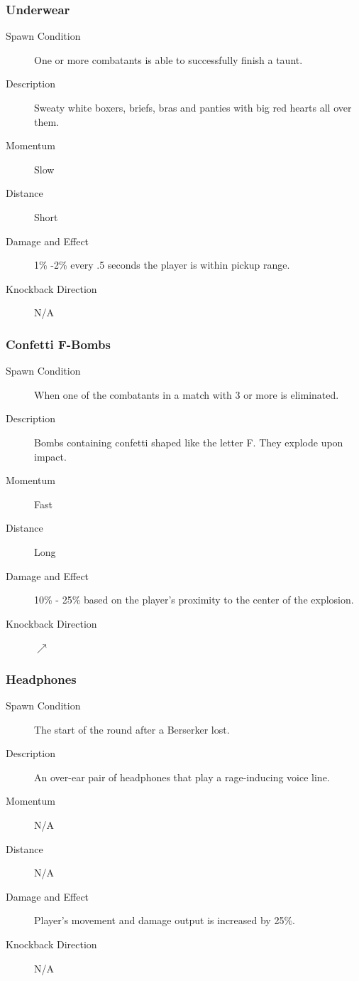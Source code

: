 \noindent\hrulefill

\subsubsection{Underwear}

\begin{description}
    \item[Spawn Condition] One or more combatants is able to successfully finish a taunt.
    \item[Description] Sweaty white boxers, briefs, bras and panties with big red hearts all over them.
    \item[Momentum] Slow
    \item[Distance] Short
    \item[Damage and Effect] 1\% -2\% every .5 seconds the player is within pickup range.
    \item[Knockback Direction] N/A
\end{description}

\noindent\hrulefill

\subsubsection{Confetti F-Bombs}

\begin{description}
    \item[Spawn Condition] When one of the combatants in a match with 3 or more is eliminated.
    \item[Description] Bombs containing confetti shaped like the letter F. They explode upon impact.
    \item[Momentum] Fast
    \item[Distance] Long
    \item[Damage and Effect] 10\% - 25\% based on the player's proximity to the center of the explosion.
    \item[Knockback Direction] $\nearrow$
\end{description}

\noindent\hrulefill

\subsubsection{Headphones}

\begin{description}
    \item[Spawn Condition] The start of the round after a Berserker lost.
    \item[Description] An over-ear pair of headphones that play a rage-inducing voice line.
    \item[Momentum] N/A
    \item[Distance] N/A
    \item[Damage and Effect] Player's movement and damage output is increased by 25\%.
    \item[Knockback Direction] N/A
\end{description}

